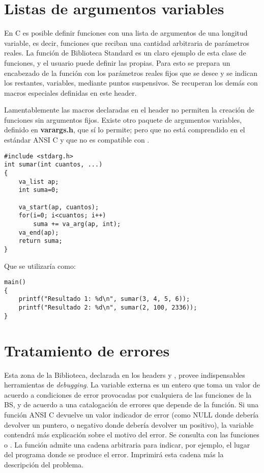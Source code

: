 \section{Listas de argumentos variables}
En C es posible definir funciones con una lista de argumentos de una longitud variable, es decir, 
funciones que reciban una cantidad arbitraria de parámetros reales. La función de Biblioteca 
Standard  es un claro ejemplo de esta clase de funciones, y el usuario puede definir las propias.
Para esto se prepara un encabezado de la función con los parámetros
reales fijos que se desee y se indican los restantes, variables, mediante
puntos suspensivos. Se recuperan los demás con macros especiales definidas en
este header.

Lamentablemente las macros declaradas en el header  no permiten la creación de funciones sin
argumentos fijos. Existe otro paquete de argumentos variables, definido en
\textbf{varargs.h}, que sí lo permite; pero que no está comprendido en el estándar ANSI
C y que no es compatible con .

\begin{ejemplo}
\begin{lstlisting}
#include <stdarg.h>
int sumar(int cuantos, ...)
{
	va_list ap;
	int suma=0;

	va_start(ap, cuantos);
	for(i=0; i<cuantos; i++)
		suma += va_arg(ap, int);
	va_end(ap);
	return suma;
}
\end{lstlisting}
Que se utilizaría como:
\begin{lstlisting}
main()
{
	printf("Resultado 1: %d\n", sumar(3, 4, 5, 6));
	printf("Resultado 2: %d\n", sumar(2, 100, 2336));
}
\end{lstlisting}
\end{ejemplo}

\section{Tratamiento de errores}
Esta zona de la Biblioteca, declarada en los headers  y , provee indispensables herramientas de \textit{debugging}. La
variable externa  es un entero que toma un valor de acuerdo a condiciones
de error provocadas por cualquiera de las funciones de la BS, y de acuerdo a
una catalogación de errores que depende de la función. Si una función ANSI C
devuelve un valor indicador de error (como NULL donde debería devolver un
puntero, o negativo donde debería devolver un positivo), la variable 
contendrá más explicación sobre el motivo del error. Se consulta con las
funciones  o . La función  admite una cadena
arbitraria para indicar, por ejemplo, el lugar del programa donde se produce el
error. Imprimirá esta cadena más la descripción del problema.

